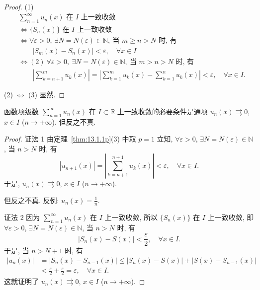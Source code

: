 \begin{proof}
(1)
\[
  \begin{aligned}
    &\sum_{n=1}^{\infty}u_{n}(x)\text{ 在 }I\text{ 上一致收敛}\\
    &\Leftrightarrow\{S_{n}(x)\}\text{ 在 }I\text{ 上一致收敛}\\
    &\Leftrightarrow\forall\varepsilon>0,\ \exists N=N(\varepsilon)\in\mathbb{N},\ \text{当 }m\geqslant n>N\text{ 时, 有}\\
    &\qquad|S_{m}(x)-S_{n}(x)|<\varepsilon,\quad\forall x\in I\\
    &\Leftrightarrow(2)\ \forall\varepsilon>0,\ \exists N=N(\varepsilon)\in\mathbb{N},\ \text{当 }m>n>N\text{ 时, 有}\\
    &\qquad\left|\sum_{k=n+1}^{m}u_{k}(x)\right|=\left|\sum_{k=1}^{m}u_{k}(x)-\sum_{k=1}^{n}u_{k}(x)\right|<\varepsilon,\quad\forall x\in I.
  \end{aligned}
\]

(2) $\Leftrightarrow$ (3) 显然.
\end{proof}

\begin{corollary}[函数项级数一致收敛的必要条件]\label{cor:13.1.1}
函数项级数 $\sum_{n=1}^{\infty}u_{n}(x)$ 在 $I\subset\mathbb{R}$ 上一致收敛的必要条件是通项 $u_{n}(x)\rightrightarrows0$, $x\in I$ ($n\to+\infty$). 但反之不真.
\end{corollary}

\begin{proof}
证法 1 由定理~\ref{thm:13.1.1p}(3) 中取 $p=1$ 立知, $\forall\varepsilon>0$, $\exists N=N(\varepsilon)\in\mathbb{N}$, 当 $n>N$ 时, 有
\[
  |u_{n+1}(x)|=\left|\sum_{k=n+1}^{n+1}u_{k}(x)\right|<\varepsilon,\quad\forall x\in I.
\]
于是, $u_{n}(x)\rightrightarrows0$, $x\in I$ ($n\to+\infty$).

但反之不真. 反例: $u_{n}(x)=\frac{1}{n}$.

证法 2 因为 $\sum_{n=1}^{\infty}u_{n}(x)$ 在 $I$ 上一致收敛, 所以 $\{S_{n}(x)\}$ 在 $I$ 上一致收敛, 即 $\forall\varepsilon>0$, $\exists N=N(\varepsilon)\in\mathbb{N}$, 当 $n>N$ 时, 有
\[
  |S_{n}(x)-S(x)|<\frac{\varepsilon}{2},\quad\forall x\in I.
\]
于是, 当 $n>N+1$ 时, 有
\[
  \begin{aligned}
    |u_{n}(x)|&=|S_{n}(x)-S_{n-1}(x)|\leqslant|S_{n}(x)-S(x)|+|S(x)-S_{n-1}(x)|\\
    &<\frac{\varepsilon}{2}+\frac{\varepsilon}{2}=\varepsilon,\quad\forall x\in I.
  \end{aligned}
\]
这就证明了 $u_{n}(x)\rightrightarrows0$, $x\in I$ ($n\to+\infty$).
\end{proof}

